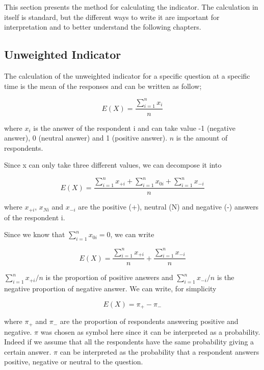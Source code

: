 \documentclass[12pt,a4paper,oneside]{book}
\begin{document}
This section presents the method for calculating the indicator. 
The calculation in itself is standard, but the different ways to write it are important for interpretation and to better understand the following chapters.

\subsection{Unweighted Indicator}

The calculation of the unweighted indicator for a specific question at a specific time is the mean of the responses and can be written as follow;

\begin{equation}
    E(X) = \frac{ \sum_{i=1}^n x_i}{n}
\end{equation} 

where 
$x_i$ is the answer of the respondent i and can take value -1 (negative answer), 0 (neutral answer) and 1 (positive answer). 
$n$ is the amount of respondents.

Since x can only take three different values, we can decompose it into 

\begin{equation}
    E(X) = \frac{ \sum_{i=1}^n x_{+i} + \sum_{i=1}^n x_{0i} + \sum_{i=1}^n x_{-i}}{n}
\end{equation} 

where 
$x_{+i}$, $x_{Ni}$ and $x_{-i}$ are the positive (+), neutral (N) and negative (-) answers of the respondent i.

Since we know that $\sum_{i=1}^n x_{0i} = 0$, we can write

\begin{equation}
    E(X) = \frac{\sum_{i=1}^n x_{+i}}{n}  + \frac{\sum_{i=1}^n x_{-i}}{n}
\end{equation} 

${\sum_{i=1}^n x_{+i}}/{n}$ is the proportion of positive answers and ${\sum_{i=1}^n x_{-i}}/{n}$ is the negative proportion of negative answer. We can write, for simplicity

\begin{equation}
    E(X) = \pi_+ - \pi_-
\end{equation}

where $\pi_+$ and $\pi_-$ are the proportion of respondents answering positive and negative.
$\pi$ was chosen as symbol here since it can be interpreted as a probability. Indeed if we assume that all the respondents have the same probability giving a certain answer. $\pi$ can be interpreted as the probability that a respondent answers positive, negative or neutral to the question. 
\end{document}
